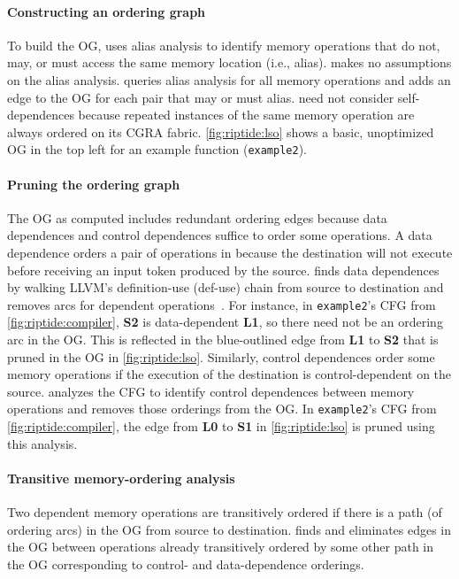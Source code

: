 \paragraph{Constructing an ordering graph} 
To build the OG, \riptidecomp uses alias analysis to identify memory operations
that do not, may, or must access the same memory location (i.e., alias).
%
\riptidecomp makes no assumptions on the alias analysis.
%
\riptide queries alias analysis for all memory operations and adds
an edge to the OG for each pair that may or must alias.
%
\riptidecomp need not consider self-dependences because repeated instances of the
same memory operation are always ordered on its CGRA fabric. %
%
\autoref{fig:riptide:lso} shows a basic, unoptimized OG in the top left for an 
example function (\texttt{example2}).

\paragraph{Pruning the ordering graph} The OG as computed includes redundant
ordering edges because data dependences and control dependences suffice to
order some operations.
%
A data dependence orders a pair of operations in \riptide 
because the destination will not execute before receiving an input token 
produced by the source.
% 
\riptidecomp finds data dependences by walking LLVM's definition-use (def-use)
chain from source to destination and removes arcs for dependent operations~\cite{nachos}.
%
For instance, in \texttt{example2}'s CFG from \autoref{fig:riptide:compiler}, 
\textbf{S2} is data-dependent \textbf{L1}, so there need not
be an ordering arc in the OG. This is reflected in the blue-outlined edge
from \textbf{L1} to \textbf{S2} that is pruned in the OG in \autoref{fig:riptide:lso}.
%
Similarly, control dependences order some memory operations if the execution of
the destination is control-dependent on the source.
%
\riptidecomp analyzes the CFG to identify control dependences
between memory operations and removes those orderings from the OG.
%
In \texttt{example2}'s CFG from \autoref{fig:riptide:compiler}, the
edge from \textbf{L0} to \textbf{S1} in \autoref{fig:riptide:lso} is pruned using this analysis.

\paragraph{Transitive memory-ordering analysis}
% 
Two dependent memory operations are transitively ordered if there is a path (of
ordering arcs) in the OG from source to destination.
%
\riptidecomp finds and eliminates edges in the OG between operations already
transitively ordered by some other path in the OG corresponding to control- and
data-dependence orderings.
%

